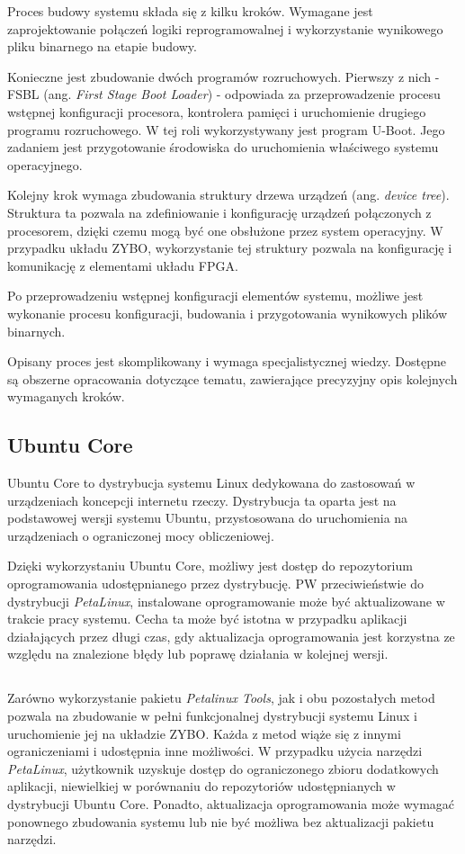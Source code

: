 Proces budowy systemu składa się z kilku kroków. Wymagane jest zaprojektowanie połączeń logiki reprogramowalnej i wykorzystanie wynikowego pliku binarnego na etapie budowy.

Konieczne jest zbudowanie dwóch programów rozruchowych. Pierwszy z nich - FSBL (ang. \emph{First Stage Boot Loader}) - odpowiada za przeprowadzenie procesu wstępnej konfiguracji procesora, kontrolera pamięci i uruchomienie drugiego programu rozruchowego. W tej roli wykorzystywany jest program U-Boot. Jego zadaniem jest przygotowanie środowiska do uruchomienia właściwego systemu operacyjnego.

Kolejny krok wymaga zbudowania struktury drzewa urządzeń (ang. \emph{device tree}). Struktura ta pozwala na zdefiniowanie i konfigurację urządzeń połączonych z procesorem, dzięki czemu mogą być one obsłużone przez system operacyjny. W przypadku układu ZYBO, wykorzystanie tej struktury pozwala na konfigurację i komunikację z elementami układu FPGA.

Po przeprowadzeniu wstępnej konfiguracji elementów systemu, możliwe jest wykonanie procesu konfiguracji, budowania i przygotowania wynikowych plików binarnych.

Opisany proces jest skomplikowany i wymaga specjalistycznej wiedzy. Dostępne są obszerne opracowania dotyczące tematu, zawierające precyzyjny opis kolejnych wymaganych kroków. \cite{zybo-zynq-getting-started,zybo-stock-linux,xilinx-build-kernel}

\subsection{Ubuntu Core}
Ubuntu Core to dystrybucja systemu Linux dedykowana do zastosowań w urządzeniach koncepcji internetu rzeczy. Dystrybucja ta oparta jest na podstawowej wersji systemu Ubuntu, przystosowana do uruchomienia na urządzeniach o ograniczonej mocy obliczeniowej.

Dzięki wykorzystaniu Ubuntu Core, możliwy jest dostęp do repozytorium oprogramowania udostępnianego przez dystrybucję. PW przeciwieństwie do dystrybucji \emph{PetaLinux}, instalowane oprogramowanie może być aktualizowane w trakcie pracy systemu. Cecha ta może być istotna w przypadku aplikacji działających przez długi czas, gdy aktualizacja oprogramowania jest korzystna ze względu na znalezione błędy lub poprawę działania w kolejnej wersji.

\subsection*{}
Zarówno wykorzystanie pakietu \emph{Petalinux Tools}, jak i obu pozostałych metod pozwala na zbudowanie w pełni funkcjonalnej dystrybucji systemu Linux i uruchomienie jej na układzie ZYBO. Każda z metod wiąże się z innymi ograniczeniami i udostępnia inne możliwości. W przypadku użycia narzędzi \emph{PetaLinux}, użytkownik uzyskuje dostęp do ograniczonego zbioru dodatkowych aplikacji, niewielkiej w porównaniu do repozytoriów udostępnianych w dystrybucji Ubuntu Core. Ponadto, aktualizacja oprogramowania może wymagać ponownego zbudowania systemu lub nie być możliwa bez aktualizacji pakietu narzędzi. 

